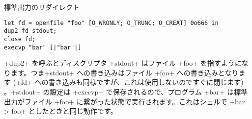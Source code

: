 \begin{example}
標準出力のリダイレクト
%
\begin{lstlisting}
let fd = openfile "foo" [O_WRONLY; O_TRUNC; O_CREAT] 0o666 in
dup2 fd stdout;
close fd;
execvp "bar" [|"bar"|]
\end{lstlisting}
%
\ml+dup2+ を呼ぶとディスクリプタ \ml+stdout+ はファイル \ml+foo+ を指すようになります。つま\ml+stdout+ への書き込みはファイル \ml+foo+ への書き込みとなります (\ml+fd+ への書き込みも同様ですが、これは使用しないのですぐに閉じます) 。\ml+stdout+ の設定は \ml+execvp+ で保存されるので、プログラム \ml+bar+ は標準出力がファイル \ml+foo+ に繋がった状態で実行されます。これはシェルで \ml+bar > foo+ としたときと同じ動作です。

\end{example}


